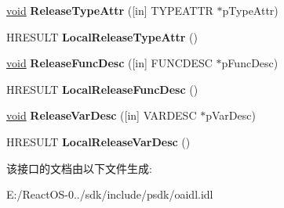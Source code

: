 \begin{DoxyCompactItemize}
\item 
\mbox{\label{interface_i_type_info_a7e18ec4eee2e1d406be11f96b1f8ce07}} 
\hyperlink{interfacevoid}{void} {\bfseries Release\+Type\+Attr} (\mbox{[}in\mbox{]} T\+Y\+P\+E\+A\+T\+TR $\ast$p\+Type\+Attr)
\item 
\mbox{\label{interface_i_type_info_a7eb9de096d21d1f9f4973258ad63aa77}} 
H\+R\+E\+S\+U\+LT {\bfseries Local\+Release\+Type\+Attr} ()
\item 
\mbox{\label{interface_i_type_info_a842ac6db11000a516869bb724bd77d97}} 
\hyperlink{interfacevoid}{void} {\bfseries Release\+Func\+Desc} (\mbox{[}in\mbox{]} F\+U\+N\+C\+D\+E\+SC $\ast$p\+Func\+Desc)
\item 
\mbox{\label{interface_i_type_info_abceac0c93c1d44f53684827d47175468}} 
H\+R\+E\+S\+U\+LT {\bfseries Local\+Release\+Func\+Desc} ()
\item 
\mbox{\label{interface_i_type_info_a827313194cb35f72f935cf8a70d5004a}} 
\hyperlink{interfacevoid}{void} {\bfseries Release\+Var\+Desc} (\mbox{[}in\mbox{]} V\+A\+R\+D\+E\+SC $\ast$p\+Var\+Desc)
\item 
\mbox{\label{interface_i_type_info_a416a35168a1c01d1b2a0cdd8b2897104}} 
H\+R\+E\+S\+U\+LT {\bfseries Local\+Release\+Var\+Desc} ()
\end{DoxyCompactItemize}


该接口的文档由以下文件生成\+:\begin{DoxyCompactItemize}
\item 
E\+:/\+React\+O\+S-\/0../sdk/include/psdk/oaidl.\+idl\end{DoxyCompactItemize}

